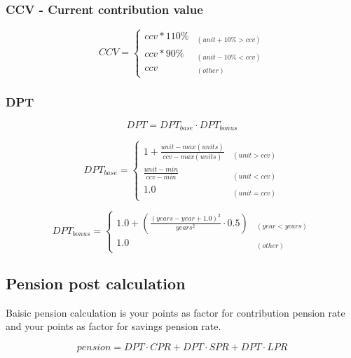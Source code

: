 \subsubsection*{CCV - Current contribution value}

\begin{equation*}
CCV = \begin{cases} 
ccv * 110\% & _{(unit+10\% > ccv)} \\
ccv * 90\% & _{(unit-10\% < ccv)} \\
ccv & _{(other)}
\end{cases}
\end{equation*}

\subsubsection*{DPT}

\begin{equation*}
DPT = DPT_{base} \cdot DPT_{bonus}
\end{equation*}

\begin{equation*}
DPT_{base} = \begin{cases} 
1 + \frac{unit-max(units)} {ccv - max(units)} 
  & _{(unit > ccv)} \\
\frac{unit - min} {ccv - min} 
  & _{(unit < ccv)} \\
1.0 & _{(unit = ccv)}
\end{cases}
\end{equation*}

\begin{equation*}
DPT_{bonus} = \begin{cases} 
1.0 + (\frac{(years - year + 1.0)^2}
      {years^2} \cdot 0.5) & _{(year < years)} \\
1.0 & _{(other)} 
\end{cases}
\end{equation*}


\newpage

\subsection{Pension post calculation}

Baisic pension calculation is your points
as factor for contribution pension rate and 
your points as factor for savings pension rate.

\begin{equation*}
pension = DPT \cdot CPR + DPT \cdot SPR + DPT \cdot LPR
\end{equation*}

